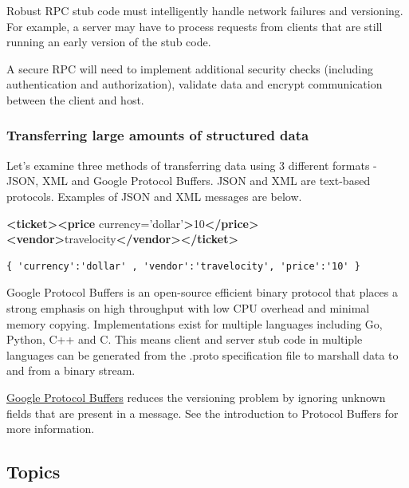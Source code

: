 \documentclass[]{article}
\newenvironment{Shaded}{}{}
\newcommand{\KeywordTok}[1]{\textcolor[rgb]{0.00,0.44,0.13}{\textbf{{#1}}}}
\newcommand{\StringTok}[1]{\textcolor[rgb]{0.25,0.44,0.63}{{#1}}}
\newcommand{\OtherTok}[1]{\textcolor[rgb]{0.00,0.44,0.13}{{#1}}}
\newcommand{\NormalTok}[1]{{#1}}
\begin{document}
Robust RPC stub code must intelligently handle network failures and
versioning. For example, a server may have to process requests from
clients that are still running an early version of the stub code.

A secure RPC will need to implement additional security checks
(including authentication and authorization), validate data and encrypt
communication between the client and host.

\subsubsection{Transferring large amounts of structured
data}\label{transferring-large-amounts-of-structured-data}

Let's examine three methods of transferring data using 3 different
formats - JSON, XML and Google Protocol Buffers. JSON and XML are
text-based protocols. Examples of JSON and XML messages are below.

\begin{Shaded}
\begin{Highlighting}[]
\KeywordTok{<ticket><price}\OtherTok{ currency=}\StringTok{'dollar'}\KeywordTok{>}\NormalTok{10}\KeywordTok{</price><vendor>}\NormalTok{travelocity}\KeywordTok{</vendor></ticket>}
\end{Highlighting}
\end{Shaded}

\begin{verbatim}
{ 'currency':'dollar' , 'vendor':'travelocity', 'price':'10' }
\end{verbatim}

Google Protocol Buffers is an open-source efficient binary protocol that
places a strong emphasis on high throughput with low CPU overhead and
minimal memory copying. Implementations exist for multiple languages
including Go, Python, C++ and C. This means client and server stub code
in multiple languages can be generated from the .proto specification
file to marshall data to and from a binary stream.

\href{https://developers.google.com/protocol-buffers/docs/overview}{Google
Protocol Buffers} reduces the versioning problem by ignoring unknown
fields that are present in a message. See the introduction to Protocol
Buffers for more information.

\subsection{Topics}\label{topics}
\end{document}
